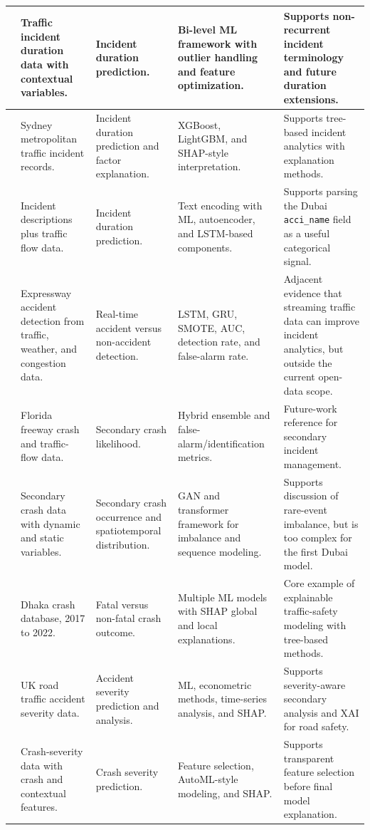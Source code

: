 \begin{longtable}{|p{0.8cm}|p{2.4cm}|p{3.0cm}|p{3.2cm}|p{3.9cm}|}
\cite{grigorev2022bilevel} & Traffic incident duration data with contextual variables. & Incident duration prediction. & Bi-level ML framework with outlier handling and feature optimization. & Supports non-recurrent incident terminology and future duration extensions. \\ \hline
\cite{grigorev2024sydney} & Sydney metropolitan traffic incident records. & Incident duration prediction and factor explanation. & XGBoost, LightGBM, and SHAP-style interpretation. & Supports tree-based incident analytics with explanation methods. \\ \hline
\cite{grigorev2022textencoding} & Incident descriptions plus traffic flow data. & Incident duration prediction. & Text encoding with ML, autoencoder, and LSTM-based components. & Supports parsing the Dubai \texttt{acci\_name} field as a useful categorical signal. \\ \hline
\cite{parsa2019realtime} & Expressway accident detection from traffic, weather, and congestion data. & Real-time accident versus non-accident detection. & LSTM, GRU, SMOTE, AUC, detection rate, and false-alarm rate. & Adjacent evidence that streaming traffic data can improve incident analytics, but outside the current open-data scope. \\ \hline
\cite{han2026secondary} & Florida freeway crash and traffic-flow data. & Secondary crash likelihood. & Hybrid ensemble and false-alarm/identification metrics. & Future-work reference for secondary incident management. \\ \hline
\cite{chen2025secondarygan} & Secondary crash data with dynamic and static variables. & Secondary crash occurrence and spatiotemporal distribution. & GAN and transformer framework for imbalance and sequence modeling. & Supports discussion of rare-event imbalance, but is too complex for the first Dubai model. \\ \hline
\cite{rifat2024explainable} & Dhaka crash database, 2017 to 2022. & Fatal versus non-fatal crash outcome. & Multiple ML models with SHAP global and local explanations. & Core example of explainable traffic-safety modeling with tree-based methods. \\ \hline
\cite{sufian2023severity} & UK road traffic accident severity data. & Accident severity prediction and analysis. & ML, econometric methods, time-series analysis, and SHAP. & Supports severity-aware secondary analysis and XAI for road safety. \\ \hline
\cite{castellani2025severity} & Crash-severity data with crash and contextual features. & Crash severity prediction. & Feature selection, AutoML-style modeling, and SHAP. & Supports transparent feature selection before final model explanation. \\ \hline

\end{longtable}

